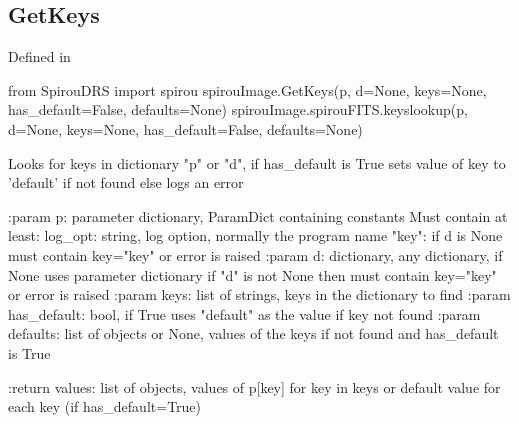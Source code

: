\begin{minipage}{\textwidth}
\subsection{GetKeys}

Defined in \spirouImage{}

\begin{pythonbox}
from SpirouDRS import spirou
spirouImage.GetKeys(p, d=None, keys=None, has_default=False, defaults=None)
spirouImage.spirouFITS.keyslookup(p, d=None, keys=None, has_default=False, defaults=None)
\end{pythonbox}

\begin{pythondocstring}
Looks for keys in dictionary "p" or "d", if has_default is True sets
value of key to 'default' if not found else logs an error

:param p: parameter dictionary, ParamDict containing constants
    Must contain at least:
            log_opt: string, log option, normally the program name
            "key": if d is None must contain key="key" or error is raised
:param d: dictionary, any dictionary, if None uses parameter dictionary
          if "d" is not None then must contain key="key" or error is raised
:param keys: list of strings, keys in the dictionary to find
:param has_default: bool, if True uses "default" as the value if key
                    not found
:param defaults: list of objects or None, values of the keys if not
                 found and has_default is True

:return values: list of objects, values of p[key] for key in keys
                or default value for each key (if has_default=True)
\end{pythondocstring}
\end{minipage}


